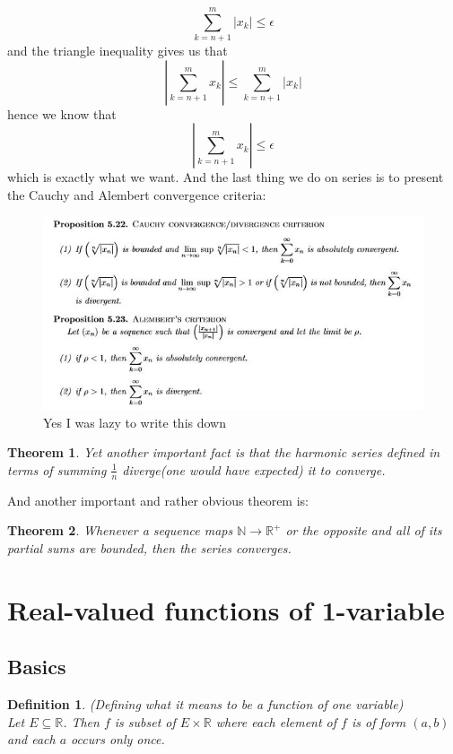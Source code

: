 \documentclass[titlepage]{article}
\newtheorem{theorem}{Theorem}[section]
\newtheorem{definition}{Definition}
\begin{document}
$$ \sum_{k=n+1}^{m} |x_{k}| \leq \epsilon$$ and the triangle inequality gives us that $$ |\sum_{k=n+1}^{m} x_{k}| \leq \sum_{k=n+1}^{m} |x_{k}| $$ hence we know that $$  |\sum_{k=n+1}^{m} x_{k}| \leq \epsilon$$ which is exactly what we want. 
And the last thing we do on series is to present the Cauchy and Alembert convergence criteria:

\begin{figure}[H]
    \centering
    \includegraphics{epflLectureNotes/analysis/figures/series.JPG}
    \caption{Yes I was lazy to write this down}
    \label{fig:my_label}
\end{figure}

\begin{theorem}
Yet another important fact is that the harmonic series defined in terms of summing $\frac{1}{n}$ diverge(one would have expected) it to converge.
\end{theorem}

And another important and rather obvious theorem is:

\begin{theorem}
Whenever a sequence maps $\mathbb{N} \to \mathbb{R^{+}}$ or the opposite and all of its partial sums are bounded, then the series converges.
\end{theorem}

\section{Real-valued functions of 1-variable}
\subsection{Basics}
\begin{definition}(Defining what it means to be  a function of one variable)
\\
Let $E\subseteq\mathbb{R}$. Then $f$ is subset of $E\times\mathbb{R}$ where each element of $f$ is of form $(a,b)$ and each $a$ occurs only once. 
\end{definition}
\\
\end{document}
